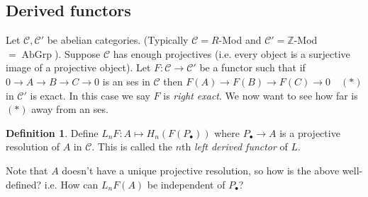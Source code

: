 \documentclass{article}
\newcommand{\Z}{\mathbb{Z}}
\newcommand{\AbGrp}{{\operatorname{AbGrp}}}
\newcommand{\ca}{\mathcal{C}}
\theoremstyle{definition}
\newtheorem{defn}{Definition}[subsection]
\begin{document}
\subsection{Derived functors}
Let $\ca,\ca'$ be abelian categories. (Typically $\ca=R$-Mod and $\ca'=\Z$-Mod\ $=\AbGrp$). Suppose $\ca$ has enough projectives (i.e. every object is a surjective image of a projective object). Let $F:\ca\rightarrow\ca'$ be a functor such that if $0\rightarrow A\rightarrow B\rightarrow C\rightarrow 0$ is an ses in $\ca$ then $F(A)\rightarrow F(B)\rightarrow F(C)\rightarrow 0 \quad (\ast)$ in $\ca'$ is exact. In this case we say $F$ is \textit{right exact}. We now want to see how far is $(\ast)$ away from an ses.

\begin{defn}
Define $L_nF:A\mapsto H_n(F(P_\bullet))$ where $P_\bullet\rightarrow A$ is a projective resolution of $A$ in $\ca$. This is called the $n$th \textit{left derived functor} of $L$.
\end{defn}

Note that $A$ doesn't have a unique projective resolution, so how is the above well-defined? i.e. How can $L_nF(A)$ be independent of $P_\bullet$?
\end{document}
